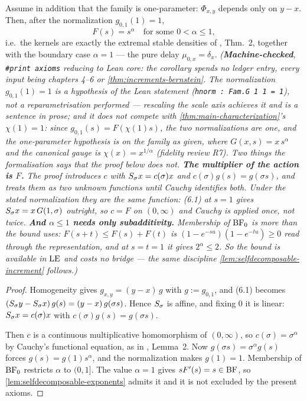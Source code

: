 \begin{corollary}\label{cor:semigroup-case}
\leanok
Assume in addition that the family is one-parameter: $\Phi_{x,y}$ depends only on $y - x$.
Then, after the normalization $g_{0,1}(1) = 1$,
\[
  F(s) = s^{\alpha} \quad \text{for some } 0 < \alpha \le 1,
\]
i.e.\ the kernels are exactly the extremal stable densities of
, Thm.~2, together with the boundary case $\alpha = 1$ --- the
pure delay $\mu_{0,x} = \delta_x$.
\statusT\quad\emph{(\textbf{Machine-checked}, \texttt{\#print axioms} reducing to Lean core: the
corollary spends no ledger entry, every input being chapters 4--6 or
\ref{thm:increments-bernstein}. The normalization $g_{0,1}(1) = 1$ is a \emph{hypothesis} of the
Lean statement (\texttt{hnorm : Fam.G 1 1 = 1}), not a reparametrisation performed --- rescaling
the scale axis achieves it and is a sentence in prose; and it does not compete with
\ref{thm:main-characterization}'s $\chi(1) = 1$: since $g_{0,1}(s) = F(\chi(1)s)$, the two
normalizations are one, and the one-parameter hypothesis is on the family \emph{as given}, where
$G(x,s) = x\,s^\alpha$ and the canonical gauge is $\chi(x) = x^{1/\alpha}$ (fidelity review R7).
Two things the formalisation says that the proof below does not.
\textbf{The multiplier of the action \emph{is} $F$.} The proof introduces $c$ with
$S_\sigma x = c(\sigma)x$ and $c(\sigma)g(s) = g(\sigma s)$, and treats them as two unknown
functions until Cauchy identifies both. Under the stated normalization they are the same function:
(6.1) at $s = 1$ gives $S_\sigma x = x\,G(1,\sigma)$ outright, so $c = F$ on $(0,\infty)$ and
Cauchy is applied once, not twice. \textbf{And $\alpha \le 1$ needs only subadditivity.} Membership
of $\mathrm{BF}_0$ is more than the bound uses: $F(s+t) \le F(s) + F(t)$ is
$(1-e^{-su})(1-e^{-tu}) \ge 0$ read through the representation, and at $s = t = 1$ it gives
$2^\alpha \le 2$. So the bound is available in $\mathrm{LE}$ and costs no bridge --- the same discipline
\ref{lem:selfdecomposable-increment} follows.)}
\end{corollary}

\begin{proof}
\leanok
Homogeneity gives $g_{x,y} = (y - x)\,g$ with $g := g_{0,1}$, and (6.1) becomes
$(S_\sigma y - S_\sigma x)\, g(s) = (y - x)\, g(\sigma s)$. Hence $S_\sigma$ is
affine, and fixing $0$ it is linear: $S_\sigma x = c(\sigma) x$ with
$c(\sigma) g(s) = g(\sigma s)$.

Then $c$ is a continuous multiplicative homomorphism of $(0,\infty)$, so $c(\sigma) =
\sigma^\alpha$ by Cauchy's functional equation, as in ,
Lemma~2. Now $g(\sigma s) = \sigma^\alpha g(s)$ forces $g(s) = g(1) s^\alpha$, and the
normalization makes $g(1) = 1$. Membership of $\mathrm{BF}_0$ restricts $\alpha$ to $(0,1]$. The value
$\alpha = 1$ gives $sF'(s) = s \in \mathrm{BF}$, so \ref{lem:selfdecomposable-exponents} admits it and
it is not excluded by the present axioms.
\end{proof}

